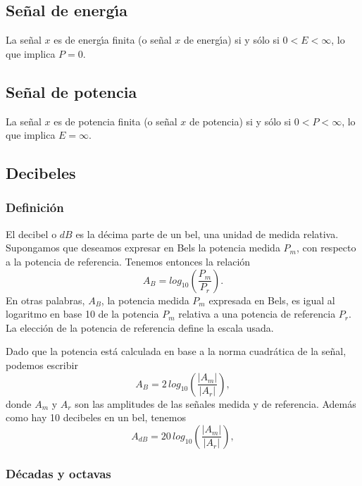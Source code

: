 \subsection{Se\~{n}al de energ\'{\i}a}

La se\~{n}al $x$ es de energ\'{\i}a finita (o se\~{n}al $x$ de
energ\'{\i}a) si y s\'{o}lo si $0 < E < \infty$, lo que implica $P =
0$.

\subsection{Se\~{n}al de potencia}

La se\~{n}al $x$ es de potencia finita (o se\~{n}al $x$ de potencia)
si y s\'{o}lo si $0 < P < \infty$, lo que implica $E = \infty$.

\subsection{Decibeles}

\subsubsection{Definici\'{o}n}

El decibel o $dB$ es la d\'{e}cima parte de un bel, una unidad de
medida relativa. Supongamos que deseamos expresar en Bels la potencia
medida $P_{m}$, con respecto a la potencia de referencia. Tenemos
entonces la relaci\'{o}n
\begin{equation}
  A_{B} = log_{10}(\frac{P_{m}}{P_{r}}).
\end{equation}
En otras palabras, $A_{B}$, la potencia medida $P_{m}$ expresada en Bels, es 
igual al logaritmo en base 10 de la potencia
$P_{m}$ relativa a una potencia de referencia $P_{r}$.  La
elecci\'{o}n de la potencia de referencia define la escala usada.

Dado que la potencia est\'{a} calculada en base a la norma
cuadrática de la se\~{n}al, podemos escribir
\begin{equation}
  A_{B} = 2 \, log_{10}(\frac{|A_{m}|}{|A_{r}|}),
\end{equation}
donde $A_{m}$ y $A_{r}$ son las amplitudes de las se\~{n}ales medida y
de referencia.  Adem\'{a}s como hay 10 decibeles en un bel, tenemos
\begin{equation}
  A_{dB} = 20 \, log_{10}(\frac{|A_{m}|}{|A_{r}|}),
\end{equation}

\subsubsection{Décadas y octavas}


